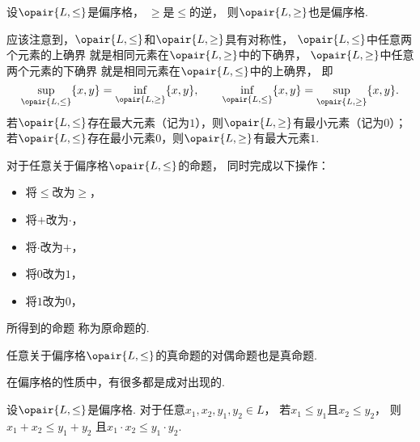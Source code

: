 \begin{proposition}
设\(\opair{L,\leq}\)是偏序格，
\(\geq\)是\(\leq\)的逆，
则\(\opair{L,\geq}\)也是偏序格.
\end{proposition}

应该注意到，\(\opair{L,\leq}\)和\(\opair{L,\geq}\)具有对称性，
\(\opair{L,\leq}\)中任意两个元素的上确界
就是相同元素在\(\opair{L,\geq}\)中的下确界，
\(\opair{L,\geq}\)中任意两个元素的下确界
就是相同元素在\(\opair{L,\leq}\)中的上确界，
即\begin{equation*}
	\sup_{\opair{L,\leq}}\{x,y\}
	= \inf_{\opair{L,\geq}}\{x,y\},
	\qquad
	\inf_{\opair{L,\leq}}\{x,y\}
	= \sup_{\opair{L,\geq}}\{x,y\}.
\end{equation*}
若\(\opair{L,\leq}\)存在最大元素（记为\(1\)），则\(\opair{L,\geq}\)有最小元素（记为\(0\)）；
若\(\opair{L,\leq}\)存在最小元素\(0\)，则\(\opair{L,\geq}\)有最大元素\(1\).

\begin{definition}
对于任意关于偏序格\(\opair{L,\leq}\)的命题，
同时完成以下操作：\begin{itemize}
	\item 将\(\leq\)改为\(\geq\)，
	\item 将\(+\)改为\(\cdot\)，
	\item 将\(\cdot\)改为\(+\)，
	\item 将\(0\)改为\(1\)，
	\item 将\(1\)改为\(0\)，
\end{itemize}
所得到的命题
称为原命题的.
\end{definition}

\begin{theorem}
任意关于偏序格\(\opair{L,\leq}\)的真命题的对偶命题也是真命题.
\end{theorem}

在偏序格的性质中，有很多都是成对出现的.
\begin{theorem}\label{theorem:格论.偏序格的保序性}
设\(\opair{L,\leq}\)是偏序格.
对于任意\(x_1,x_2,y_1,y_2 \in L\)，
若\(x_1 \leq y_1\)且\(x_2 \leq y_2\)，
则\(x_1 + x_2 \leq y_1 + y_2\)
且\(x_1 \cdot x_2 \leq y_1 \cdot y_2\).
\end{theorem}

